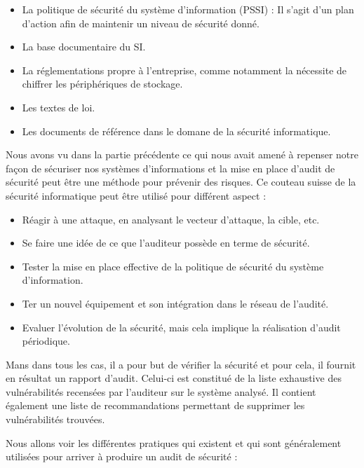 \documentclass[a4paper]{memoir}
\begin{document}
\begin{itemize}
  \item La politique de sécurité du système d'information (PSSI) : Il s'agit d'un plan d'action afin de maintenir un niveau de sécurité donné.
  \item La base documentaire du SI.
  \item La réglementations propre à l'entreprise, comme notamment la nécessite de chiffrer les périphériques de stockage.
  \item Les textes de loi.
    \item Les documents de référence dans le domane de la sécurité informatique.\\
\end{itemize}

Nous avons vu dans la partie précédente ce qui nous avait amené à repenser notre façon de sécuriser nos systèmes d'informations et la mise en place d'audit de sécurité peut être une méthode pour prévenir des risques. Ce couteau suisse de la sécurité informatique peut être utilisé pour différent aspect :

\begin{itemize}
\item Réagir à une attaque, en analysant le vecteur d'attaque, la cible, etc.
\item Se faire une idée de ce que l'auditeur possède en terme de sécurité.
\item Tester la mise en place effective de la politique de sécurité du système d'information.
\item Ter un nouvel équipement et son intégration dans le réseau de l'audité.
\item Evaluer l'évolution de la sécurité, mais cela implique la réalisation d'audit périodique.\\
\end{itemize}

Mans dans tous les cas, il a pour but de vérifier la sécurité et pour cela, il fournit en résultat un rapport d'audit. Celui-ci est constitué de la liste exhaustive des vulnérabilités recensées par l'auditeur sur le système analysé. Il contient également une liste de recommandations permettant de supprimer les vulnérabilités trouvées.

Nous allons voir les différentes pratiques qui existent et qui sont généralement utilisées pour arriver à produire un audit de sécurité :\\
\end{document}
